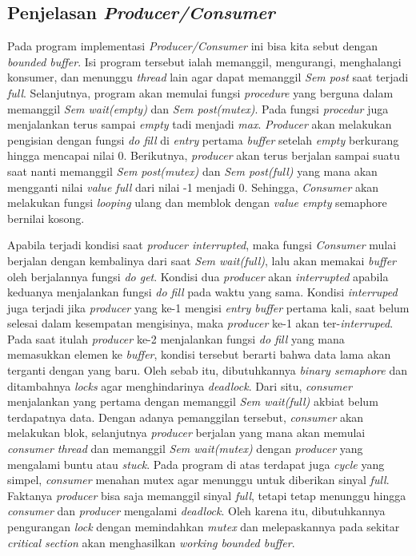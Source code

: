 \documentclass[11pt,a4paper]{article}
\begin{document}
\subsection{Penjelasan \textit{Producer/Consumer}}
Pada program implementasi \textit{Producer/Consumer} ini bisa kita sebut dengan \textit{bounded buffer}. Isi program tersebut ialah memanggil, mengurangi, menghalangi konsumer, dan menunggu \textit{thread} lain agar dapat memanggil \textit{Sem post} saat terjadi \textit{full}. 
Selanjutnya, program akan memulai fungsi \textit{procedure} yang berguna dalam memanggil \textit{Sem wait(empty)} dan \textit{Sem post(mutex)}. Pada fungsi \textit{procedur} juga menjalankan terus sampai \textit{empty} tadi menjadi \textit{max}. \textit{Producer} akan melakukan pengisian 
dengan fungsi \textit{do fill} di \textit{entry} pertama \textit{buffer} setelah \textit{empty} berkurang hingga mencapai nilai 0. Berikutnya, \textit{producer} akan terus berjalan sampai suatu saat nanti memanggil \textit{Sem post(mutex)} dan \textit{Sem post(full)} yang mana akan mengganti 
nilai \textit{value full} dari nilai -1 menjadi 0. Sehingga, \textit{Consumer} akan melakukan fungsi \textit{looping} ulang dan memblok dengan \textit{value empty} semaphore bernilai kosong. \par
Apabila terjadi kondisi saat \textit{producer interrupted}, maka fungsi \textit{Consumer} mulai berjalan dengan kembalinya dari saat \textit{Sem wait(full)}, lalu akan memakai \textit{buffer} oleh berjalannya fungsi \textit{do get}. Kondisi dua \textit{producer} akan \textit{interrupted} apabila keduanya 
menjalankan fungsi \textit{do fill} pada waktu yang sama. Kondisi \textit{interruped} juga terjadi jika \textit{producer} yang ke-1 mengisi \textit{entry buffer} pertama kali, saat belum selesai dalam kesempatan mengisinya, maka \textit{producer} ke-1 akan ter-\textit{interruped}. Pada saat itulah \textit{producer} 
ke-2 menjalankan fungsi \textit{do fill} yang mana memasukkan elemen ke \textit{buffer}, kondisi tersebut berarti bahwa data lama akan terganti dengan yang baru. Oleh sebab itu, dibutuhkannya \textit{binary semaphore} dan ditambahnya \textit{locks} agar menghindarinya \textit{deadlock}. Dari situ, \textit{consumer} 
menjalankan yang pertama dengan memanggil \textit{Sem wait(full)} akbiat belum terdapatnya data. Dengan adanya pemanggilan tersebut, \textit{consumer} akan melakukan blok, selanjutnya \textit{producer} berjalan yang mana akan memulai \textit{consumer thread} dan memanggil \textit{Sem wait(mutex)} dengan \textit{producer} 
yang mengalami buntu atau \textit{stuck}. Pada program di atas terdapat juga \textit{cycle} yang simpel, \textit{consumer} menahan mutex agar menunggu untuk diberikan sinyal \textit{full}. Faktanya \textit{producer} bisa saja memanggil sinyal \textit{full}, tetapi tetap menunggu hingga \textit{consumer} dan \textit{producer} mengalami \textit{deadlock}. Oleh karena itu, 
dibutuhkannya pengurangan \textit{lock} dengan memindahkan \textit{mutex} dan melepaskannya pada sekitar \textit{critical section} akan menghasilkan \textit{working bounded buffer}.
\end{document}
